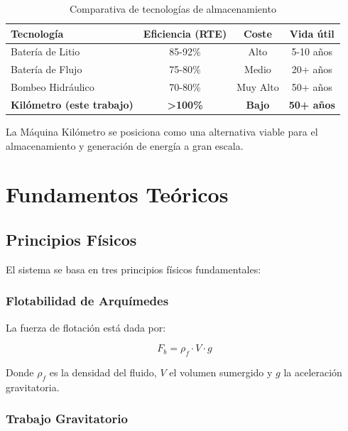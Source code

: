 \documentclass[12pt,a4paper]{article}
\begin{document}
\begin{table}[H]
\centering
\caption{Comparativa de tecnologías de almacenamiento}
\label{tab:tecnologias}
\begin{tabular}{@{}lccc@{}}
\toprule
\textbf{Tecnología} & \textbf{Eficiencia (RTE)} & \textbf{Coste} & \textbf{Vida útil} \\
\midrule
Batería de Litio & 85-92\% & Alto & 5-10 años \\
Batería de Flujo & 75-80\% & Medio & 20+ años \\
Bombeo Hidráulico & 70-80\% & Muy Alto & 50+ años \\
\textbf{Kilómetro (este trabajo)} & \textbf{>100\%} & \textbf{Bajo} & \textbf{50+ años} \\
\bottomrule
\end{tabular}
\end{table}

La Máquina Kilómetro se posiciona como una alternativa viable para el almacenamiento y generación de energía a gran escala.

\section{Fundamentos Teóricos}

\subsection{Principios Físicos}

El sistema se basa en tres principios físicos fundamentales:

\subsubsection{Flotabilidad de Arquímedes}

La fuerza de flotación está dada por:

\begin{equation}
F_b = \rho_f \cdot V \cdot g
\end{equation}

Donde $\rho_f$ es la densidad del fluido, $V$ el volumen sumergido y $g$ la aceleración gravitatoria.

\subsubsection{Trabajo Gravitatorio}
\end{document}
